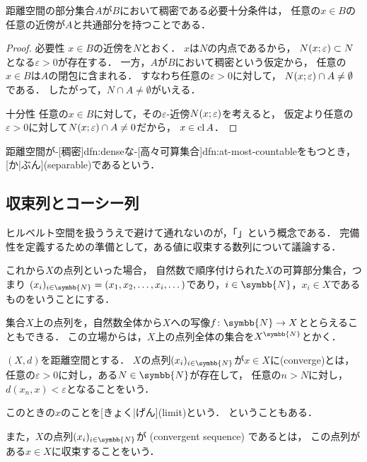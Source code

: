 \documentclass[../sotsu.tex]{subfiles}
\begin{document}
\begin{proposition}
    距離空間の部分集合$A$が$B$において稠密である必要十分条件は，
    任意の$x \in B$の任意の近傍が$A$と共通部分を持つことである\cite{iwanami-functional}．
\end{proposition}

\begin{proof}
    \textsf{必要性} \quad 
    $x \in B$の近傍を$N$とおく．
    $x$は$N$の内点であるから，
    $N(x; \varepsilon) \subset N$となる$\varepsilon > 0$が存在する．
    一方，$A$が$B$において稠密という仮定から，
    任意の$x \in B$は$A$の閉包に含まれる．
    すなわち任意の$\varepsilon > 0$に対して，
    $N(x; \varepsilon) \cap A \neq \emptyset$である．
    したがって，$N \cap A \neq \emptyset$がいえる．

    \textsf{十分性} \quad 
    任意の$x \in B$に対して，その$\varepsilon$-近傍$N(x; \varepsilon)$を考えると，
    仮定より任意の$\varepsilon > 0$に対して$N(x; \varepsilon) \cap A \neq 0$だから，
    $x \in \operatorname{cl}{A}$．
\end{proof}


\begin{definition}
    \label{dfn:separable}
    距離空間が-[稠密]{dfn:dense}な-[高々可算集合]{dfn:at-most-countable}をもつとき，
    [か|ぶん](separable)であるという．
\end{definition}





\subsection{収束列とコーシー列}

ヒルベルト空間を扱ううえで避けて通れないのが，「」という概念である．
完備性を定義するための準備として，ある値に収束する数列について議論する．

これから$X$の点列といった場合，
自然数で順序付けられた$X$の可算部分集合，つまり
$\sequ{x_i}[i \in \symbb{N}] = (x_1, x_2, \dots, x_i, \dotsc)$であり，$i \in \symbb{N}$，$x_i \in X$であるものをいうことにする．

集合$X$上の点列を，自然数全体から$X$への写像$f \colon \symbb{N} \to X$ととらえることもできる．
この立場からは，$X$上の点列全体の集合を$X^{\symbb{N}}$とかく．

\begin{definition}[収束列]
    \label{dfn:convergent-sequence}
    $(X, d)$を距離空間とする．
    $X$の点列$\sequ{x_i}[i \in \symbb{N}]$が$x \in X$に(converge)とは，
    任意の$\varepsilon > 0$に対し，ある$N \in \symbb{N}$が存在して，
    任意の$n > N$に対し，$d(x_n, x) < \varepsilon$となることをいう．
    
    このときの$x$のことを[きょく|げん](limit)という\cite{uchida-set-2020}．
    ということもある．

    また，$X$の点列$\sequ{x_i}[i \in \symbb{N}]$が%
    (convergent sequence)%
    であるとは，
    この点列がある$x \in X$に収束することをいう．
\end{definition}
\end{document}
